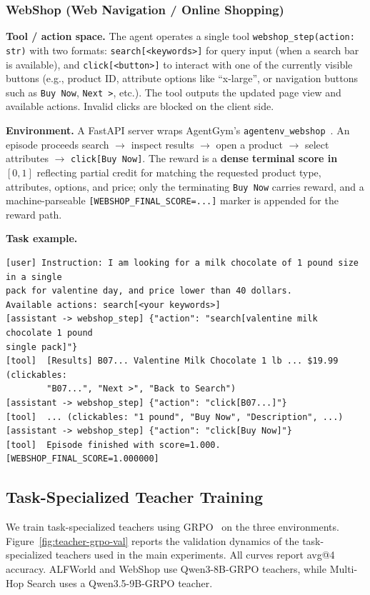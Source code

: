 \subsubsection{WebShop (Web Navigation / Online Shopping)}
\label{app:envs:webshop}

\textbf{Tool / action space.} The agent operates a single tool \texttt{webshop\_step(action: str)} with two formats: \texttt{search[<keywords>]} for query input (when a search bar is available), and \texttt{click[<button>]} to interact with one of the currently visible buttons (e.g., product ID, attribute options like ``x-large'', or navigation buttons such as \texttt{Buy Now}, \texttt{Next >}, etc.). The tool outputs the updated page view and available actions. Invalid clicks are blocked on the client side.

\textbf{Environment.} A FastAPI server wraps AgentGym's
\texttt{agentenv\_webshop}~\citep{xi2025agentgym}. An episode proceeds search $\to$ inspect results $\to$ open a
product $\to$ select attributes $\to$ \texttt{click[Buy Now]}. The reward is a
\textbf{dense terminal score in $[0,1]$} reflecting partial credit for matching the
requested product type, attributes, options, and price; only the terminating
\texttt{Buy Now} carries reward, and a machine-parseable
\texttt{[WEBSHOP\_FINAL\_SCORE=...]} marker is appended for the reward path.

\textbf{Task example.}
\begin{verbatim}
[user] Instruction: I am looking for a milk chocolate of 1 pound size in a single
pack for valentine day, and price lower than 40 dollars.
Available actions: search[<your keywords>]
[assistant -> webshop_step] {"action": "search[valentine milk chocolate 1 pound
single pack]"}
[tool]  [Results] B07... Valentine Milk Chocolate 1 lb ... $19.99  (clickables:
        "B07...", "Next >", "Back to Search")
[assistant -> webshop_step] {"action": "click[B07...]"}
[tool]  ... (clickables: "1 pound", "Buy Now", "Description", ...)
[assistant -> webshop_step] {"action": "click[Buy Now]"}
[tool]  Episode finished with score=1.000.  [WEBSHOP_FINAL_SCORE=1.000000]
\end{verbatim}

\subsection{Task-Specialized Teacher Training}
\label{app:teacher-grpo}

We train task-specialized teachers using GRPO~\citep{shao2024deepseekmath} on the three environments.
Figure~\ref{fig:teacher-grpo-val} reports the validation dynamics of the
task-specialized teachers used in the main experiments. All curves report avg@4 accuracy. ALFWorld and WebShop use Qwen3-8B-GRPO
teachers, while Multi-Hop Search uses a Qwen3.5-9B-GRPO teacher.

